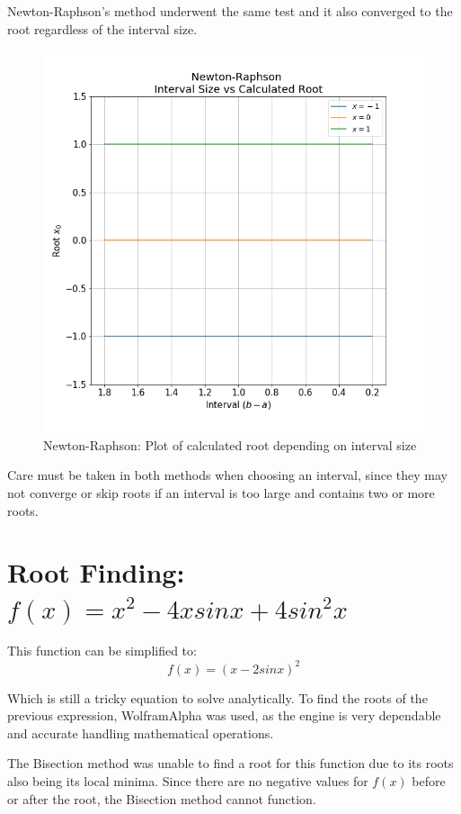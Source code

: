 \documentclass[twocolumn]{article}
\begin{document}
Newton-Raphson's method underwent the same test and it also converged to the root regardless of the interval size.
\begin{figure}[h!]
 \centering
 \includegraphics[scale = 0.4]{f3_nrtest}
 \caption{Newton-Raphson: Plot of calculated root depending on interval size}
 \label{fig:f3_nrtest}
\end{figure}

Care must be taken in both methods when choosing an interval, since they may not converge or skip roots if an interval is too large and contains
two or more roots.

\section{Root Finding:\\$f(x)=x^2-4xsinx+4sin^2x$}
This function can be simplified to:
\begin{equation*}
 f(x) = (x - 2sinx)^2
\end{equation*}

Which is still a tricky equation to solve analytically. To find the roots of the previous expression, WolframAlpha was used, as the engine is very dependable
and accurate handling mathematical operations.

The Bisection method was unable to find a root for this function due to its roots also being its local minima. Since there are no negative values for $f(x)$ before
or after the root, the Bisection method cannot function.
\end{document}
